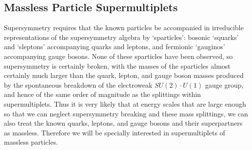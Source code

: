 
\subsection{Massless Particle Supermultiplets}

\providecommand{\WeylQ}{\mathrm{Q}}

Supersymmetry requires that the known particles be accompanied in irreducible
representations of the supersymmetry algebra by `sparticles': bosonic
`squarks' and `sleptons' accompanying quarks and leptons, and fermionic
`gauginos' accompanying gauge bosons. None of these sparticles have been
observed, so supersymmetry is certainly broken, with the masses of the
sparticles almost certainly much larger than the quark, lepton, and gauge
boson masses produced by the spontaneous breakdown of the electroweak
$SU(2)\cdot U(1)$ gauge group, and hence of the same order of magnitude as the
splittings within supermultiplets. Thus it is very likely that at energy
scales that are large enough so that we can neglect supersymmetry breaking and
these mass splittings, we can also treat the known quarks, leptons, and gauge
bosons and their superpartners as massless. Therefore we will be specially
interested in supermultiplets of massless particles.

